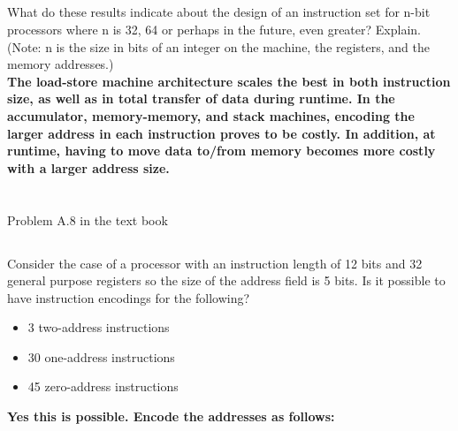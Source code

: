 \documentclass{article}
\begin{document}
\subsection{}
What do these results indicate about the design of an instruction set for n-bit processors where n is 32, 64 or perhaps in the future, even greater? Explain. (Note: n is the size in bits of an integer on the machine, the registers, and the memory addresses.)\\
\textbf{The load-store machine architecture scales the best in both instruction size, as well as in total transfer of data during runtime. In the accumulator, memory-memory, and stack machines, encoding the larger address in each instruction proves to be costly. In addition, at runtime, having to move data  to/from memory becomes more costly with a larger address size. }
\vspace{1cm}
\pagebreak
\section{}
Problem A.8 in the text book\\
\subsection{}
    Consider the case of a processor with an instruction length of 12 bits and 32 general purpose registers so the size of the address field is 5 bits. Is it possible to have instruction encodings for the following?
    \begin{itemize}
        \item 3 two-address instructions
        \item 30 one-address instructions
        \item 45 zero-address instructions
    \end{itemize}
    \vspace{5mm}

    \textbf{Yes this is possible. Encode the addresses as follows:} \\
    \vspace{5mm}
    
\end{document}
